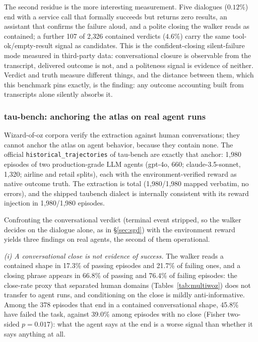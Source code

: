 The second residue is the more interesting measurement.
Five dialogues ($0.12\%$) end with a service call that formally succeeds but returns zero
results, an assistant that confirms the failure aloud, and a polite closing the walker reads
as contained; a further 107 of 2{,}326 contained verdicts ($4.6\%$) carry the same
tool-ok/empty-result signal as candidates.
This is the confident-closing silent-failure mode measured in third-party data: conversational
closure is observable from the transcript, delivered outcome is not, and a politeness signal
is evidence of neither.
Verdict and truth measure different things, and the distance between them, which this
benchmark pins exactly, is the finding: any outcome accounting built from transcripts alone
silently absorbs it.
\label{sec:sgd}

\subsubsection*{tau-bench: anchoring the atlas on real agent runs}
\label{sec:taubench}
Wizard-of-oz corpora verify the extraction against human conversations; they cannot anchor
the atlas on agent behavior, because they contain none.
The official \texttt{historical\_trajectories} of tau-bench \citep{sierra2024taubench} are exactly
that anchor: 1{,}980 episodes of two production-grade LLM agents (gpt-4o, 660; claude-3.5-sonnet,
1{,}320; airline and retail splits), each with the environment-verified reward as native
outcome truth.
The extraction is total (1{,}980/1{,}980 mapped verbatim, no errors), and the shipped taubench
dialect is internally consistent with its reward injection in 1{,}980/1{,}980 episodes.

Confronting the conversational verdict (terminal event stripped, so the walker decides on
the dialogue alone, as in \S\ref{sec:sgd}) with the environment reward yields three
findings on real agents, the second of them operational.

\emph{(i) A conversational close is not evidence of success.} The walker reads a contained
shape in 17.3\% of passing episodes and 21.7\% of failing ones, and a closing phrase
appears in 66.8\% of passing and 76.4\% of failing episodes: the close-rate proxy that
separated human domains (Tables~\ref{tab:multiwoz}) does not transfer to agent runs, and
conditioning on the close is mildly anti-informative. Among the 378 episodes that end in
a contained conversational shape, 45.8\% have failed the task, against 39.0\% among
episodes with no close (Fisher two-sided $p=0.017$): what the agent says at the end is a
worse signal than whether it says anything at all.

